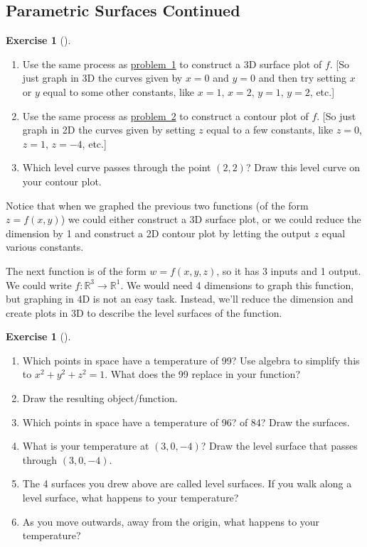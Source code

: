 \documentclass[10pt,]{book}
\theoremstyle{plain}
\theoremstyle{definition}
\theoremstyle{definition}
\theoremstyle{definition}
\theoremstyle{definition}
\newtheorem{exploration}[project]{Exercise}
\theoremstyle{definition}
\numberwithin{equation}{section}
\begin{document}
\subsection[{Parametric Surfaces Continued}]{Parametric Surfaces Continued}\label{subsection-25}
\begin{exploration}[]\label{exploration-112}
\leavevmode%
\begin{enumerate}[font=\bfseries,label=(\alph*),ref=\alph*]
\item\label{task-219} Use the same process as \hyperref[prob_3dsurface_plot]{problem~1} to construct a 3D surface plot of \(f\). [So just graph in 3D the curves given by \(x=0\) and \(y=0\) and then try setting \(x\) or \(y\) equal to some other constants, like \(x=1\), \(x=2\), \(y=1\), \(y=2\), etc.]%
\item\label{task-220} Use the same process as \hyperref[prob_intro_to_contour_plots]{problem~2} to construct a contour plot of \(f\). [So just graph in 2D the curves given by setting \(z\) equal to a few constants, like \(z=0\), \(z=1\), \(z=-4\), etc.]%
\item\label{task-221} Which level curve passes through the point \((2,2)\)?  Draw this level curve on your contour plot.%
\end{enumerate}
\end{exploration}
Notice that when we graphed the previous two functions (of the form \(z=f(x,y)\)) we could either construct a 3D surface plot, or we could reduce the dimension by 1 and construct a 2D contour plot by letting the output \(z\) equal various constants.%
\par
The next function is of the form \(w=f(x,y,z)\), so it has 3 inputs and 1 output. We could write \(f\colon \mathbb{R}^3\to\mathbb{R}^1\). We would need 4 dimensions to graph this function, but graphing in 4D is not an easy task. Instead, we'll reduce the dimension and create plots in 3D to describe the level surfaces of the function.%
\begin{exploration}[]\label{exploration-113}
\leavevmode%
\begin{enumerate}[font=\bfseries,label=(\alph*),ref=\alph*]
\item\label{task-222} Which points in space have a temperature of 99? Use algebra to simplify this to \(x^2+y^2+z^2=1\). What does the 99 replace in your function?%
%
\item\label{task-223} Draw the resulting object/function.%
\item\label{task-224} Which points in space have a temperature of 96? of 84? Draw the surfaces.%
\item\label{task-225} What is your temperature at \((3,0,-4)\)? Draw the level surface that passes through \((3,0,-4)\).%
\item\label{task-226} The 4 surfaces you drew above are called level surfaces. If you walk along a level surface, what happens to your temperature?%
\item\label{task-227} As you move outwards, away from the origin, what happens to your temperature?%
\end{enumerate}
\end{exploration}
\end{document}
